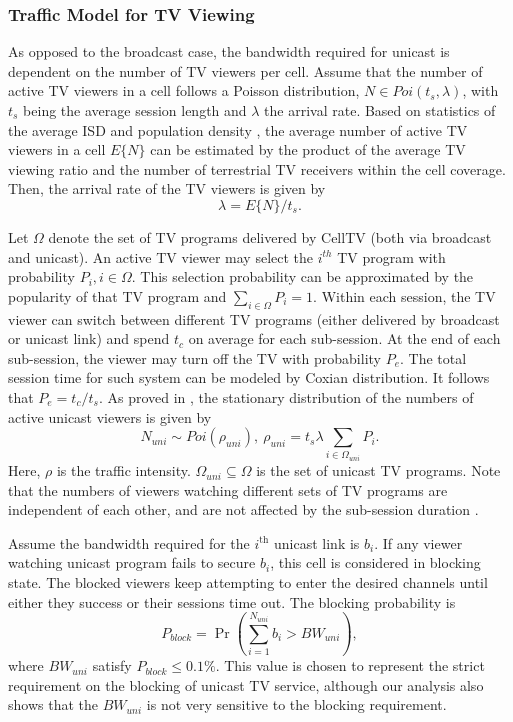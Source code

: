 \documentclass[journal]{IEEEtran}
\begin{document}
\subsubsection{\textbf{Traffic Model for TV Viewing}}
As opposed to the broadcast case, the bandwidth required for unicast is dependent on the number of TV viewers per cell. Assume that the number of active TV viewers in a cell follows a Poisson distribution, $N\in Poi(t_s,\lambda)$, with $t_s$ being the average session length and $\lambda$ the arrival rate. Based on statistics of the average ISD and population density \cite{PTS2}\cite{PTS3}, the average number of active TV viewers in a cell $E\{N\}$ can be estimated by the product of the average TV viewing ratio and the number of terrestrial TV receivers within the cell coverage. Then, the arrival rate of the TV viewers is given by
\begin{equation}\label{lambda}
 	\lambda=E\{N\}/t_s.	
\end{equation}

Let $\Omega$ denote the set of TV programs delivered by CellTV (both via broadcast and unicast). An active TV viewer may select the $i^{th}$ TV program with probability $P_i, i\in\Omega$. This selection probability can be approximated by the popularity of that TV program and $\sum_{i\in\Omega}P_i =1$. Within each session, the TV viewer can switch between different TV programs (either delivered by broadcast or unicast link) and spend $t_c$ on average for each sub-session. At the end of each sub-session, the viewer may turn off the TV with probability $P_e$. The total session time for such system can be modeled by Coxian distribution. It follows that $P_e=t_c/t_s$. As proved in \cite{Caterin}, the stationary distribution of the numbers of active unicast viewers is given by
\begin{equation}\label{eqn:N_pop}
  	N_{uni}\sim Poi(\rho_{uni}),~\rho_{uni}=t_s\lambda\sum_{i\in\Omega_{uni}}P_i.
\end{equation}
Here, $\rho$ is the traffic intensity. $\Omega_{uni}\subseteq\Omega$ is the set of unicast TV programs. Note that the numbers of viewers watching different sets of TV programs are independent of each other, and are not affected by the sub-session duration \cite{Caterin}.

Assume the bandwidth required for the $i^{\textrm{th}}$ unicast link is $b_i$. If any viewer watching unicast program fails to secure $b_i$, this cell is considered in blocking state. The blocked viewers keep attempting to enter the desired channels until either they success or their sessions time out. The blocking probability is
\begin{equation}\label{eqn:block}
  P_{block}=\Pr(\sum_{i=1}^{N_{uni}}b_i >BW_{uni}) ,
\end{equation}
where $BW_{uni}$ satisfy $P_{block}\leq 0.1\%$. This value is chosen to represent the strict requirement on the blocking of unicast TV service, although our analysis also shows that the $BW_{uni}$ is not very sensitive to the blocking requirement.
\end{document}
